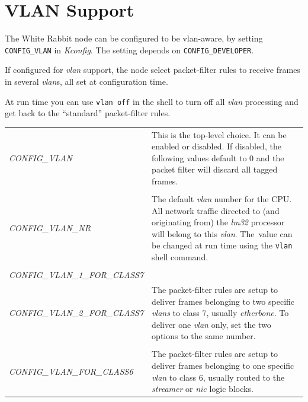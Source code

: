 \documentclass[a4paper, 12pt]{article}
\begin{document}
\newpage
\section{VLAN Support}
\label{VLAN Support}

The White Rabbit node can be configured to be vlan-aware, by setting
\texttt{CONFIG\_VLAN} in \textit{Kconfig}.  The setting depends on \texttt{CONFIG\_DEVELOPER}.

If configured for \textit{vlan} support, the node select packet-filter rules
to receive frames in several \textit{vlan}s, all set at configuration time.

At run time you can use \texttt{vlan off} in the shell to turn off all \textit{vlan}
processing and get back to the ``standard'' packet-filter rules.

\begin{longtable}{  p{6.5cm}  p{9cm} }

\small{\textit{CONFIG\_VLAN}} &

	This is the top-level choice. It can be enabled or disabled.
        If disabled, the following values default to 0 and the
        packet filter will discard all tagged frames.\\
& \\
\small{\textit{CONFIG\_VLAN\_NR}} &

	The default \textit{vlan} number for the CPU.  All network traffic
        directed to (and originating from) the \textit{lm32} processor will
        belong to this \textit{vlan}.  The~value can be changed at run time
        using the \texttt{vlan} shell command.\\
& \\
\small{\textit{CONFIG\_VLAN\_1\_FOR\_CLASS7}} & \\
\small{\textit{CONFIG\_VLAN\_2\_FOR\_CLASS7}} &

	The packet-filter rules are setup to deliver frames belonging
        to two specific \textit{vlans} to class 7, usually \textit{etherbone}.
        To deliver one \textit{vlan} only, set the two options to the same
        number.\\
& \\
\small{\textit{CONFIG\_VLAN\_FOR\_CLASS6}} &

	The packet-filter rules are setup to deliver frames belonging
        to one specific \textit{vlan} to class 6, usually routed to the
        \textit{streamer} or \textit{nic} logic blocks.\\

\end{longtable}
\end{document}
